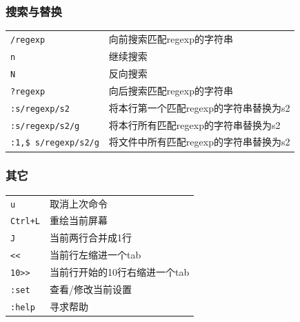 \documentclass[compress]{beamer}
\begin{document}
\begin{frame}[fragile]
\frametitle{搜索与替换}

{\small
    \begin{tabular}{l p{6cm}} \hline
    \verb~/regexp~ & 向前搜索匹配regexp的字符串 \\
    \verb~n~ & 继续搜索 \\
    \verb~N~ & 反向搜索 \\
    \verb~?regexp~ & 向后搜索匹配regexp的字符串 \\
    \verb~:s/regexp/s2~ & 将本行第一个匹配regexp的字符串替换为s2 \\
    \verb~:s/regexp/s2/g~ & 将本行所有匹配regexp的字符串替换为s2 \\
    \verb~:1,$ s/regexp/s2/g~ & 将文件中所有匹配regexp的字符串替换为s2 \\ \hline
    \end{tabular}
}

\end{frame}

\begin{frame}[fragile]
\frametitle{其它}

    \begin{tabular}{l p{8cm}} \hline
    \verb~u~ & 取消上次命令 \\
    \verb~Ctrl+L~ & 重绘当前屏幕 \\
    \verb~J~ & 当前两行合并成1行 \\
    \verb~<<~ & 当前行左缩进一个tab \\
    \verb~10>>~ & 当前行开始的10行右缩进一个tab \\
    \verb~:set~ & 查看/修改当前设置 \\
    \verb~:help~ & 寻求帮助 \\ \hline
    \end{tabular}
\end{frame}
\end{document}
